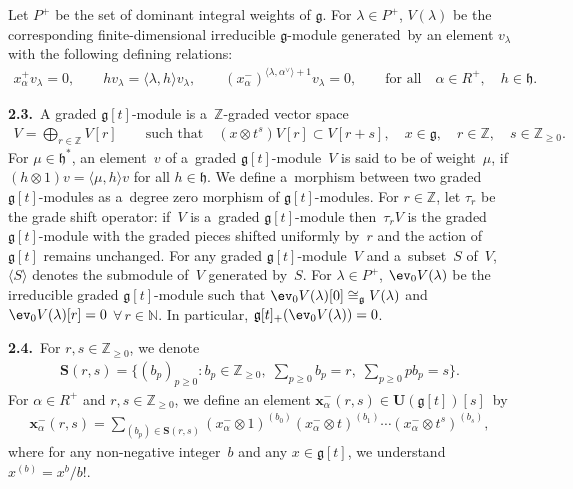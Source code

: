 Let $P^{+}$ be the set of dominant integral weights of $\mathfrak{g}$.
For $\lambda\in P^+$, $V(\lambda)$ be the corresponding f\/inite-dimensional irreducible $\mathfrak{g}$-module generated~by
an element $v_{\lambda}$ with the following def\/ining relations:
\begin{gather*}
x^{+}_{\alpha}v_\lambda=0,
\qquad
h v_\lambda = \langle \lambda, h \rangle v_\lambda,
\qquad
(x^{-}_{\alpha})^{\langle \lambda, \alpha^{\vee} \rangle +1}  v_\lambda=0,
\qquad
\text{for all}
\quad
\alpha\in R^+,
\quad
h\in\mathfrak{h}.
\end{gather*}

{\bf 2.3.}~A graded $\mathfrak{g}[t]$-module is a~$\mathbb{Z}$-graded vector space
\begin{gather*}
V=\bigoplus_{r\in\mathbb{Z}} V[r] \qquad
\text{such that}
\quad
(x\otimes t^s) V[r]\subset V[r+s],
\quad
x\in\mathfrak{g},
\quad
r\in\mathbb{Z},
\quad
s\in\mathbb{Z}_{\geq0}.
\end{gather*}
For $\mu\in\mathfrak{h}^*$, an element~$v$ of a~graded $\mathfrak{g}[t]$-module~$V$ is said to be of weight~$\mu$, if
$(h\otimes 1)v=\langle \mu, h\rangle v$ for all $h\in \mathfrak{h}$.
We def\/ine a~morphism between two graded $\mathfrak{g}[t]$-modules as a~degree zero morphism of
$\mathfrak{g}[t]$-modules.
For $r\in\mathbb{Z}$, let $\tau_r$ be the grade shift operator: if~$V$ is a~graded $\mathfrak{g}[t]$-module then~$\tau_r
V$ is the graded $\mathfrak{g}[t]$-module with the graded pieces shifted uniformly by~$r$ and the action of~$\mathfrak{g}[t]$ remains unchanged.
For any graded $\mathfrak{g}[t]$-module~$V$ and a~subset~$S$ of~$V$, $\langle S\rangle$ denotes the submodule of~$V$ generated by~$S$.
For $\lambda\in P^+$, $\ev_0 V(\lambda)$ be the irreducible graded $\mathfrak{g}[t]$-module such
that $\ev_0 V(\lambda)[0]\cong_{\mathfrak{g}} V(\lambda)$ and $\ev_0 V(\lambda)[r]=0$
$\forall\, r\in \mathbb{N}$.
In particular, $\mathfrak{g}[t]_{+}(\ev_0 V(\lambda))=0$.

{\bf 2.4.}~For $r,s\in\mathbb{Z}_{\geq0}$, we denote
\begin{gather*}
\mathbf{S}(r,s)=\bigg\{(b_p)_{p\geq0}: b_p\in\mathbb{Z}_{\geq0},
\;
\sum\limits_{p\geq 0}b_p =r,
\;
\sum\limits_{p\geq0}pb_p=s\bigg\}.
\end{gather*}
For $\alpha\in R^{+}$ and $r,s\in\mathbb{Z}_{\geq0}$, we def\/ine an element
$\mathbf{x}^{-}_{\alpha}(r,s)\in\mathbf{U}(\mathfrak{g}[t])[s]$~by
\begin{gather*}
\mathbf{x}^{-}_{\alpha}(r,s)=\sum\limits_{(b_p)\in\mathbf{S}(r,s)} (x^{-}_{\alpha} \otimes 1)^{(b_0)}(x^{-}_{\alpha}
\otimes t)^{(b_1)}\cdots(x^{-}_{\alpha} \otimes t^s)^{(b_s)},
\end{gather*}
where for any non-negative integer~$b$ and any $x\in\mathfrak{g}[t]$, we understand
$x^{(b)}=x^b/b!$.

